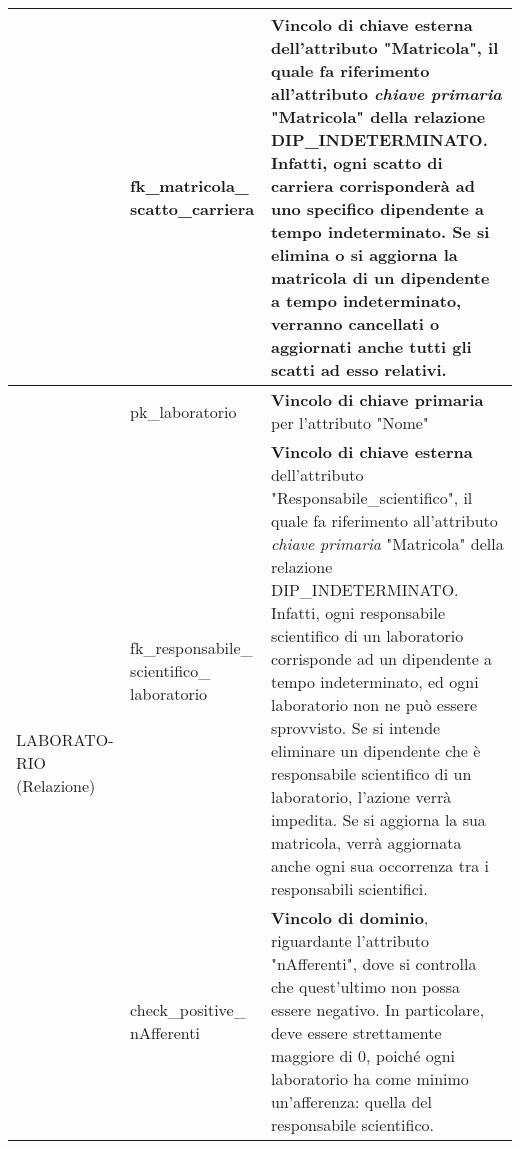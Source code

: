 \begin{center}
\begin{tabular}{|C{2.5cm}|C{3.2cm}|L{9cm}|}
                    & fk\_matricola\_ scatto\_carriera
                    & \textbf{Vincolo di chiave esterna} dell'attributo "Matricola", il quale fa riferimento all'attributo \textit{chiave primaria} "Matricola" della relazione DIP\_INDETERMINATO. Infatti, ogni scatto di carriera corrisponderà ad uno specifico dipendente a tempo indeterminato. Se si elimina o si aggiorna la matricola di un dipendente a tempo indeterminato, verranno cancellati o aggiornati anche tutti gli scatti ad esso relativi.\\
                \hline
                    [-2cm]{\centering LABORATO- RIO (Relazione)}
                    & pk\_laboratorio
                    & \textbf{Vincolo di chiave primaria} per l'attributo "Nome"\\
                
                    & fk\_responsabile\_ scientifico\_ laboratorio 
                    & \textbf{Vincolo di chiave esterna} dell'attributo "Responsabile\_scientifico", il quale fa riferimento all'attributo \textit{chiave primaria} "Matricola" della relazione DIP\_INDETERMINATO. Infatti, ogni responsabile scientifico di un laboratorio corrisponde ad un dipendente a tempo indeterminato, ed ogni laboratorio non ne può essere sprovvisto. Se si intende eliminare un dipendente che è responsabile scientifico di un laboratorio, l'azione verrà impedita. Se si aggiorna la sua matricola, verrà aggiornata anche ogni sua occorrenza tra i responsabili scientifici.\\
                    & check\_positive\_ nAfferenti
                    & \textbf{Vincolo di dominio}, riguardante l'attributo "nAfferenti", dove si controlla che quest'ultimo non possa essere negativo. In particolare, deve essere strettamente maggiore di 0, poiché ogni laboratorio ha come minimo un'afferenza: quella del responsabile scientifico.\\
                \hline
            \end{tabular}
        \end{center}


